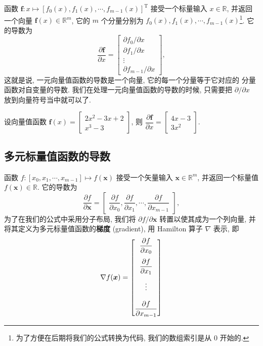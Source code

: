 \documentclass[10pt,UTF8]{book} %
\begin{document}
函数 $\boldsymbol{f}: x \mapsto [f_0(x), f_1(x), \cdots, f_{m-1}(x)]^\mathrm{T}$
接受一个标量输入 $x \in \mathbb{R}$, 并返回一个向量 $\boldsymbol{f}(x) \in \mathbb{R}^m$,
它的 $m$ 个分量分别为 $f_0(x), f_1(x), \cdots, f_{m-1}(x)$\footnote{
    为了方便在后期将我们的公式转换为代码, 我们的数组索引是从 $0$ 开始的.
}. 它的导数为
\[ \dfrac{\partial \boldsymbol{f}}{\partial x}
= \begin{bmatrix}
    \partial f_0 / \partial x \\ 
    \partial f_1 / \partial x \\ 
    \vdots \\ 
    \partial f_{m-1} / \partial x
\end{bmatrix}, \]
这就是说, {\kaishu 一元向量值函数的导数是一个向量, 它的每一个分量等于它对应的
分量函数对自变量的导数}. 我们在处理一元向量值函数的导数的时候, 只需要把 $\partial / \partial x$
放到向量符号当中就可以了.

\begin{example}
    设向量值函数 $\boldsymbol{f}(x) = \begin{bmatrix}
        2x^2 - 3x + 2 \\ 
        x^3 - 3
    \end{bmatrix}$,
    则 $\dfrac{\partial \boldsymbol{f}}{\partial x} = \begin{bmatrix}
        4x-3 \\ 
        3x^2
    \end{bmatrix}$.
\end{example}

\subsection{多元标量值函数的导数}

函数 $f: [x_0, x_1, \cdots, x_{m-1}] \mapsto f(\boldsymbol{x})$
接受一个矢量输入 $\boldsymbol{x} \in \mathbb{R}^m$, 并返回一个标量值
$f(\boldsymbol{x}) \in \mathbb{R}$. 它的导数为
\[ \dfrac{\partial f}{\partial \boldsymbol{x}}
= \begin{bmatrix}
    \dfrac{\partial f}{\partial x_0 },
    \dfrac{\partial f}{\partial x_1},
    \cdots,
    \dfrac{\partial f}{\partial x_{m-1}}
\end{bmatrix}, \]
为了在我们的公式中采用分子布局, 我们将 $\partial f/\partial \boldsymbol{x}$
转置以使其成为一个列向量, 并将其定义为多元标量值函数的\textbf{梯度} (gradient),
用 Hamilton 算子 $\nabla$ 表示, 即
\[ \nabla f(\boldsymbol{x}) = \begin{bmatrix}
    \dfrac{\partial f}{\partial x_0 } \\[\bigskipamount]
    \dfrac{\partial f}{\partial x_1} \\[\bigskipamount]
    \vdots \\[\bigskipamount]
    \dfrac{\partial f}{\partial x_{m-1}}
\end{bmatrix} \]
\end{document}
